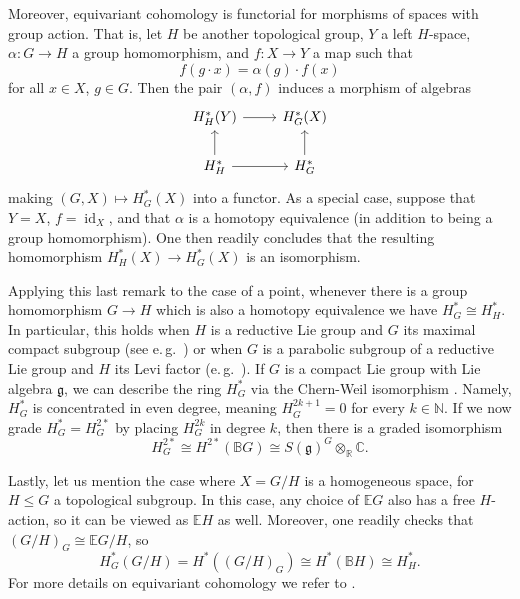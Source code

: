 \documentclass{amsart}
\newcommand{\eg}{e.\,g.}
\newcommand{\C}{\mathbb{C}}
\newcommand{\g}{\mathfrak{g}}
\newcommand{\id}{\operatorname{id}}
\newcommand{\N}{\mathbb{N}}
\newcommand{\R}{\mathbb{R}}
\theoremstyle{definition}
\theoremstyle{plain}
\theoremstyle{remark}
\begin{document}
Moreover, equivariant cohomology is functorial for morphisms of spaces with group action. That is, let $H$ be another topological group, $Y$ a left $H$-space, $\alpha\colon G\to H$ a group homomorphism, and $f\colon X\to Y$ a map such that
\begin{equation}
\label{eq:eq_coh_functor_condition}
    f(g\cdot x) = \alpha(g)\cdot f(x)
\end{equation}
for all $x\in X$, $g\in G$. Then the pair $(\alpha,f)$ induces a morphism of algebras
\begin{equation}
\label{eq:eq_coh_functor_result}
\begin{tikzcd}
    H^*_H(Y)
        \arrow[r]
    & H^*_G(X)
    \\
    H^*_H
        \arrow[u]
        \arrow[r]
    & H^*_G
        \arrow[u]
\end{tikzcd}
\end{equation}
making $(G,X)\mapsto H^*_G(X)$ into a functor. As a special case, suppose that $Y=X$, $f=\id_X$, and that $\alpha$ is a homotopy equivalence (in addition to being a group homomorphism). One then readily concludes that the resulting homomorphism $H^*_H(X)\to H^*_G(X)$ is an isomorphism. 

Applying this last remark to the case of a point, whenever there is a group homomorphism $G\to H$ which is also a homotopy equivalence we have $H^*_G\cong H^*_H$. In particular, this holds when $H$ is a reductive Lie group and $G$ its maximal compact subgroup (see \eg\ \cite[Prop.\,7.19(a)]{KnappLG}) or when $G$ is a parabolic subgroup of a reductive Lie group and $H$ its Levi factor (\eg\ \cite[Prop.\,7.83(d)]{KnappLG}). If $G$ is a compact Lie group with Lie algebra $\g$, we can describe the ring $H^*_G$ via the Chern-Weil isomorphism \cite[p.\,116]{Chern_complex_mfds}. Namely, $H^*_G$ is concentrated in even degree, meaning $H^{2k+1}_G = 0$ for every $k\in \N$. If we now grade $H^*_G = H^{2*}_G$ by placing $H^{2k}_G$ in degree $k$, then there is a graded isomorphism
\begin{equation}
\label{eq:Chern-Weil}
    H^{2*}_G 
    \cong H^{2*}(\mathbb{B}G)
    \cong S(\g)^G\! \otimes_\R \C.
\end{equation}

Lastly, let us mention the case where $X=G/H$ is a homogeneous space, for $H\le G$ a topological subgroup. In this case, any choice of $\mathbb{E}G$ also has a free $H$-action, so it can be viewed as $\mathbb{E}H$ as well. Moreover, one readily checks that $(G/H)_G\cong \mathbb{E}G/H$, so
\begin{equation}
\label{eq:eq_coh_of_hmg_sp}
    H^*_G(G/H)
    =
    H^*((G/H)_G)
    \cong
    H^*(\mathbb{B}H)
    \cong
    H^*_H.
\end{equation}
For more details on equivariant cohomology we refer to \cite{Carlson_thesis}.
\end{document}
